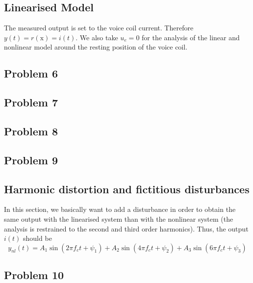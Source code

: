 \documentclass[12pt,a4paper,fleqn, onesside]{report}
\begin{document}
\subsection{Linearised Model}
The measured output is set to the voice coil current. Therefore $y(t) = r(\text{x}) = i(t)$.
We also take $u_{e} = 0$ for the analysis of the linear and nonlinear model around the resting position of the voice coil. 

\subsection*{Problem 6}


\subsection*{Problem 7}


\subsection*{Problem 8}


\subsection*{Problem 9}


\subsection{Harmonic distortion and fictitious disturbances}
In this section, we basically want to add a disturbance in order to obtain the same output with the linearised system than with the nonlinear system (the analysis is restrained to the second and third order harmonics). Thus, the output $i(t)$ should be
\begin{equation}
\label{eq:output}
y_{nl}(t)=A_1\sin(2\pi f_ct+\psi_1)+A_2\sin(4\pi f_ct+\psi_2)+A_3\sin(6\pi f_ct+\psi_3)
\end{equation}

\subsection*{Problem 10}

\end{document}
